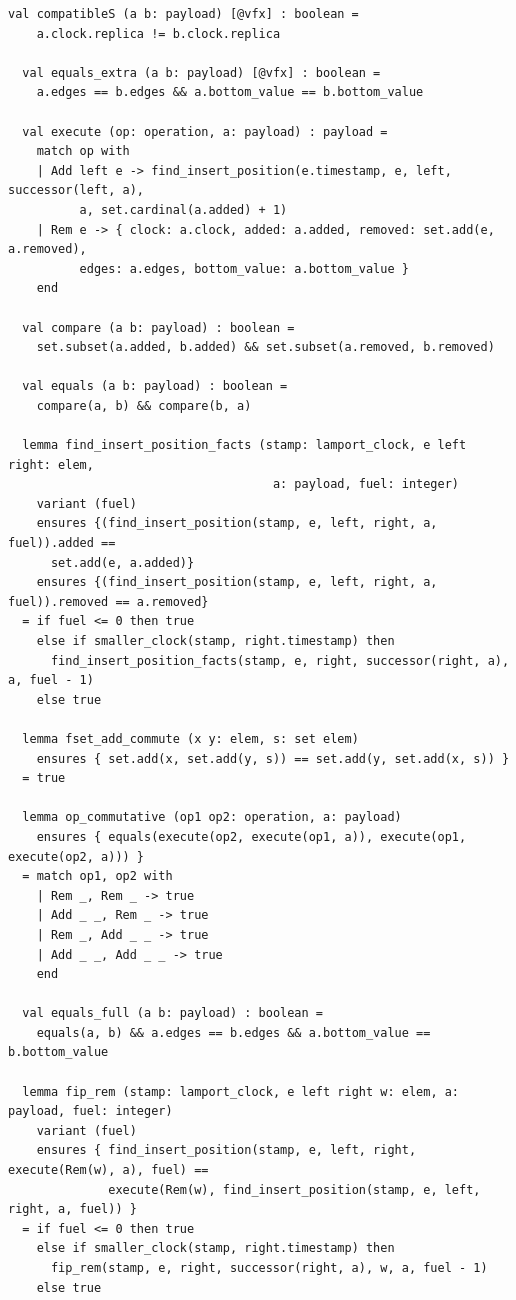 \begin{lstlisting}[caption={\texttt{RGA}}, label={lst:app_rga}]
  val compatibleS (a b: payload) [@vfx] : boolean =
    a.clock.replica != b.clock.replica

  val equals_extra (a b: payload) [@vfx] : boolean =
    a.edges == b.edges && a.bottom_value == b.bottom_value

  val execute (op: operation, a: payload) : payload =
    match op with
    | Add left e -> find_insert_position(e.timestamp, e, left, successor(left, a),
          a, set.cardinal(a.added) + 1)
    | Rem e -> { clock: a.clock, added: a.added, removed: set.add(e, a.removed),
          edges: a.edges, bottom_value: a.bottom_value }
    end

  val compare (a b: payload) : boolean =
    set.subset(a.added, b.added) && set.subset(a.removed, b.removed)

  val equals (a b: payload) : boolean =
    compare(a, b) && compare(b, a)

  lemma find_insert_position_facts (stamp: lamport_clock, e left right: elem,
                                     a: payload, fuel: integer)
    variant (fuel)
    ensures {(find_insert_position(stamp, e, left, right, a, fuel)).added ==
      set.add(e, a.added)}
    ensures {(find_insert_position(stamp, e, left, right, a, fuel)).removed == a.removed}
  = if fuel <= 0 then true
    else if smaller_clock(stamp, right.timestamp) then
      find_insert_position_facts(stamp, e, right, successor(right, a), a, fuel - 1)
    else true

  lemma fset_add_commute (x y: elem, s: set elem)
    ensures { set.add(x, set.add(y, s)) == set.add(y, set.add(x, s)) }
  = true

  lemma op_commutative (op1 op2: operation, a: payload)
    ensures { equals(execute(op2, execute(op1, a)), execute(op1, execute(op2, a))) }
  = match op1, op2 with
    | Rem _, Rem _ -> true
    | Add _ _, Rem _ -> true
    | Rem _, Add _ _ -> true
    | Add _ _, Add _ _ -> true
    end
  
  val equals_full (a b: payload) : boolean =
    equals(a, b) && a.edges == b.edges && a.bottom_value == b.bottom_value

  lemma fip_rem (stamp: lamport_clock, e left right w: elem, a: payload, fuel: integer)
    variant (fuel)
    ensures { find_insert_position(stamp, e, left, right, execute(Rem(w), a), fuel) ==
              execute(Rem(w), find_insert_position(stamp, e, left, right, a, fuel)) }
  = if fuel <= 0 then true
    else if smaller_clock(stamp, right.timestamp) then
      fip_rem(stamp, e, right, successor(right, a), w, a, fuel - 1)
    else true


\end{lstlisting}
